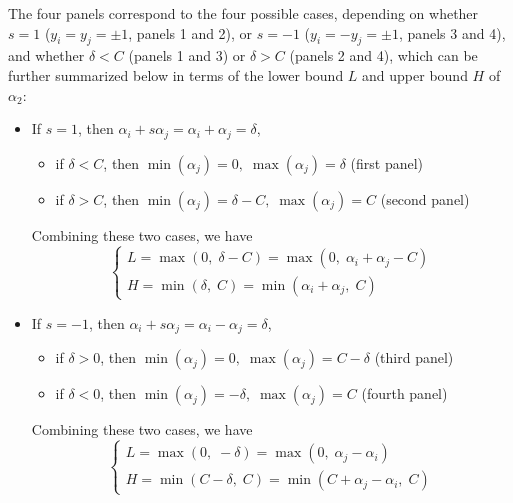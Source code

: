 \documentclass{article}
\begin{document}
The four panels correspond to the four possible cases, depending 
on whether $s=1$ ($y_i=y_j=\pm 1$, panels 1 and 2), or $s=-1$
($y_i=-y_j=\pm 1$, panels 3 and 4), and whether $\delta<C$ (panels
1 and 3) or $\delta>C$ (panels 2 and 4), which can be further 
summarized below in terms of the lower bound $L$ and upper bound 
$H$ of $\alpha_2$: 
\begin{itemize}
\item If $s=1$, then   $\alpha_i+s\alpha_j=\alpha_i+\alpha_j=\delta$,
  \begin{itemize}
  \item if $\delta<C$, then $\min(\alpha_j)=0,\;\max(\alpha_j)=\delta$ 
    (first panel)
  \item if $\delta>C$, then $\min(\alpha_j)=\delta-C,\;\max(\alpha_j)=C$
    (second panel)
  \end{itemize}
  Combining these two cases, we have
  \begin{equation}
    \left\{\begin{array}{l}
    L=\max(0,\;\delta-C)=\max(0,\;\alpha_i+\alpha_j-C)\\
    H=\min(\delta,\;C)=\min(\alpha_i+\alpha_j,\;C)
    \end{array}\right.
  \end{equation}
\item If $s=-1$, then $\alpha_i+s\alpha_j=\alpha_i-\alpha_j=\delta$,
  \begin{itemize}
  \item if $\delta>0$, then $\min(\alpha_j)=0,\;\max(\alpha_j)=C-\delta$
    (third panel)
  \item if $\delta<0$, then $\min(\alpha_j)=-\delta,\;\max(\alpha_j)=C$
    (fourth panel)
  \end{itemize}
  Combining these two cases, we have
  \begin{equation}
    \left\{\begin{array}{l}
    L=\max(0,\;-\delta)=\max(0,\;\alpha_j-\alpha_i)\\
    H=\min(C-\delta,\;C)=\min(C+\alpha_j-\alpha_i,\;C)
    \end{array}\right.
  \end{equation}
\end{itemize}
\end{document}
